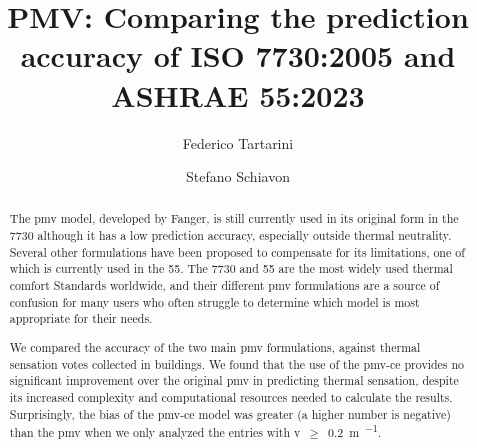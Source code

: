 \begin{frontmatter}

    \title{PMV: Comparing the prediction accuracy of ISO 7730:2005 and ASHRAE 55:2023}

    \author[label1,label2]{Federico Tartarini}
    \author[label3]{Stefano Schiavon}

    \address[label1]{Berkeley Education Alliance for Research in Singapore, Singapore}
    \address[label2]{Heat and Health Research Incubator, Faculty of Health and Medicine, University of Sydney, Sydney, AU}
    \address[label3]{Center for the Built Environment, University of California, Berkeley, CA, USA}


    \begin{abstract}

        The \ac{pmv} model, developed by Fanger, is still currently used in its original form in the \gls{7730} although it has a low prediction accuracy, especially outside thermal neutrality.
        Several other formulations have been proposed to compensate for its limitations, one of which is currently used in the \gls{55}.
        The \gls{7730} and \gls{55} are the most widely used thermal comfort Standards worldwide, and their different \ac{pmv} formulations are a source of confusion for many users who often struggle to determine which model is most appropriate for their needs.

        We compared the accuracy of the two main \ac{pmv} formulations, against  thermal sensation votes collected in buildings.
        We found that the use of the \ac{pmv-ce} provides no significant improvement over the original \ac{pmv} in predicting thermal sensation, despite its increased complexity and computational resources needed to calculate the results.
        Surprisingly, the bias of the \ac{pmv-ce} model was greater (a higher number is negative) than the \ac{pmv} when we only analyzed the entries with \ac{v}~$\geq$~\qty{0.2}{\m\per\sec}.


\end{abstract}
\end{frontmatter}
